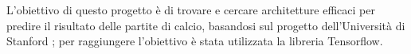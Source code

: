 L'obiettivo di questo progetto è di trovare e cercare architetture efficaci per predire il risultato delle partite di calcio, basandosi sul progetto dell'Università di Stanford \cite{cs230:2020}; 
per raggiungere l'obiettivo è stata utilizzata la libreria Tensorflow.